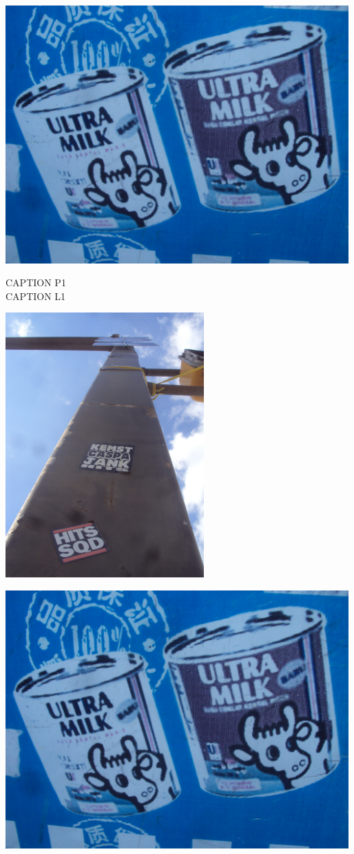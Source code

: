\documentclass[10pt,letterpaper]{article}
\begin{document}
\vspace{0.25in}
\includegraphics[width=5.19in]{landscape.jpg}

CAPTION P1\\
CAPTION L1\\
\pagebreak

\includegraphics[height=4in]{portrait.jpg}

\vspace{0.25in}
\includegraphics[width=5.19in]{landscape.jpg}
\end{document}
